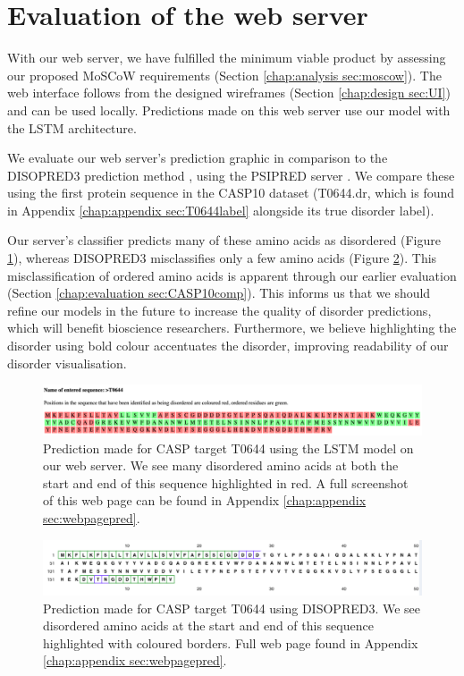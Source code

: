 \documentclass{l4proj}
\begin{document}
\section{Evaluation of the web server}
With our web server, we have fulfilled the minimum viable product by assessing our proposed MoSCoW requirements (Section \ref{chap:analysis sec:moscow}). The web interface follows from the designed wireframes (Section \ref{chap:design sec:UI}) and can be used locally. Predictions made on this web server use our model with the LSTM architecture.

We evaluate our web server’s prediction graphic in comparison to the DISOPRED3 prediction method \citep{Jones:15}, using the PSIPRED server \citep{Jones:19}. We compare these using the first protein sequence in the CASP10 dataset (T0644.dr, which is found in Appendix \ref{chap:appendix sec:T0644label} alongside its true disorder label).

Our server’s classifier predicts many of these amino acids as disordered (Figure \ref{fig:mypredclipped}), whereas DISOPRED3 misclassifies only a few amino acids (Figure \ref{fig:disopredclipped}). This misclassification of ordered amino acids is apparent through our earlier evaluation (Section \ref{chap:evaluation sec:CASP10comp}). This informs us that we should refine our models in the future to increase the quality of disorder predictions, which will benefit bioscience researchers. Furthermore, we believe highlighting the disorder using bold colour accentuates the disorder, improving readability of our disorder visualisation. 
\begin{figure}[!htb]
    \centering
    \includegraphics[width=\linewidth]{images/web_eval/mypred-clipped.pdf}
    
    \caption{Prediction made for CASP target T0644 using the LSTM model on our web server. We see many disordered amino acids at both the start and end of this sequence highlighted in red. A full screenshot of this web page can be found in Appendix \ref{chap:appendix sec:webpagepred}.}
    
    \label{fig:mypredclipped}
\end{figure}
\begin{figure}[!htb]
    \centering
    \includegraphics[width=\linewidth]{images/web_eval/disopred-clipped.pdf}
    
    \caption{Prediction made for CASP target T0644 using DISOPRED3. We see disordered amino acids at the start and end of this sequence highlighted with coloured borders. Full web page found in Appendix \ref{chap:appendix sec:webpagepred}.}
    
    \label{fig:disopredclipped}
\end{figure}
\end{document}
